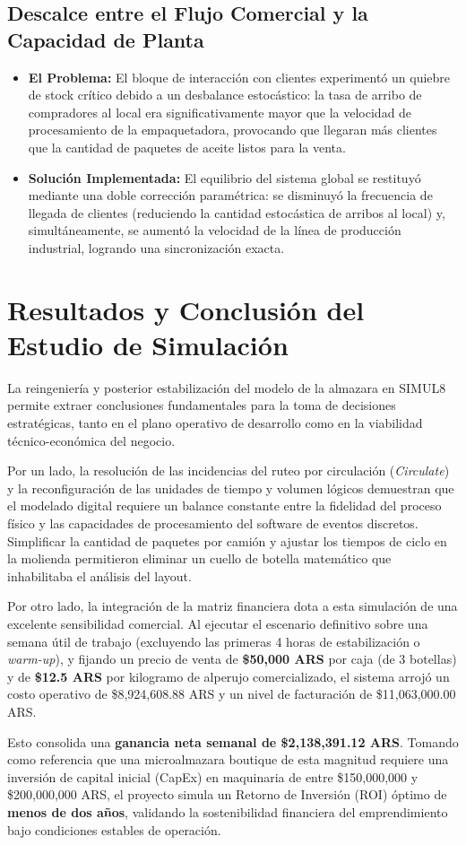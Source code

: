 \documentclass[runningheads]{llncs}
\begin{document}
\subsection{Descalce entre el Flujo Comercial y la Capacidad de Planta}
\begin{itemize}
    \item \textbf{El Problema:} El bloque de interacción con clientes experimentó un quiebre de stock crítico debido a un desbalance estocástico: la tasa de arribo de compradores al local era significativamente mayor que la velocidad de procesamiento de la empaquetadora, provocando que llegaran más clientes que la cantidad de paquetes de aceite listos para la venta.
    \item \textbf{Solución Implementada:} El equilibrio del sistema global se restituyó mediante una doble corrección paramétrica: se disminuyó la frecuencia de llegada de clientes (reduciendo la cantidad estocástica de arribos al local) y, simultáneamente, se aumentó la velocidad de la línea de producción industrial, logrando una sincronización exacta.
\end{itemize}


\section{Resultados y Conclusión del Estudio de Simulación}

La reingeniería y posterior estabilización del modelo de la almazara en SIMUL8 permite extraer conclusiones fundamentales para la toma de decisiones estratégicas, tanto en el plano operativo de desarrollo como en la viabilidad técnico-económica del negocio.

Por un lado, la resolución de las incidencias del ruteo por circulación (\textit{Circulate}) y la reconfiguración de las unidades de tiempo y volumen lógicos demuestran que el modelado digital requiere un balance constante entre la fidelidad del proceso físico y las capacidades de procesamiento del software de eventos discretos. Simplificar la cantidad de paquetes por camión y ajustar los tiempos de ciclo en la molienda permitieron eliminar un cuello de botella matemático que inhabilitaba el análisis del layout.

Por otro lado, la integración de la matriz financiera dota a esta simulación de una excelente sensibilidad comercial. Al ejecutar el escenario definitivo sobre una semana útil de trabajo (excluyendo las primeras 4 horas de estabilización o \textit{warm-up}), y fijando un precio de venta de \textbf{\$50,000 ARS} por caja (de 3 botellas) y de \textbf{\$12.5 ARS} por kilogramo de alperujo comercializado, el sistema arrojó un costo operativo de \$8,924,608.88 ARS y un nivel de facturación de \$11,063,000.00 ARS. 

Esto consolida una \textbf{ganancia neta semanal de \$2,138,391.12 ARS}. Tomando como referencia que una microalmazara boutique de esta magnitud requiere una inversión de capital inicial (CapEx) en maquinaria de entre \$150,000,000 y \$200,000,000 ARS, el proyecto simula un Retorno de Inversión (ROI) óptimo de \textbf{menos de dos años}, validando la sostenibilidad financiera del emprendimiento bajo condiciones estables de operación.
\end{document}
